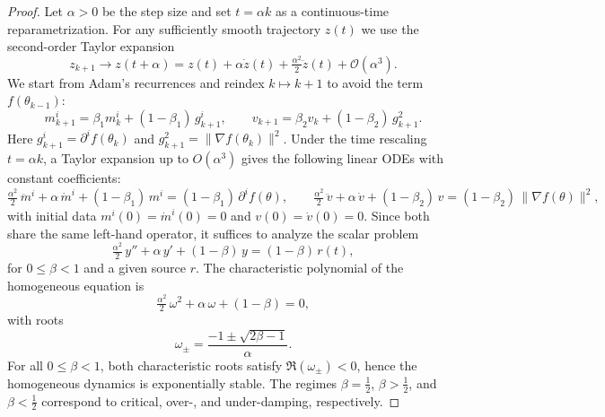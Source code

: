 \documentclass{article} %
\begin{document}
\begin{proof}
Let $\alpha>0$ be the step size and set $t=\alpha k$ as a continuous-time reparametrization. For any sufficiently smooth trajectory $z(t)$ we use the second-order Taylor expansion
\[
z_{k+1} \to z(t+\alpha)=z(t)+\alpha \dot z(t)+\tfrac{\alpha^2}{2}\ddot z(t)+\mathcal{O}(\alpha^3).
\]
We start from Adam’s recurrences and reindex $k\mapsto k+1$ to avoid the term $f(\theta_{k-1})$:
\[
m^i_{k+1}=\beta_1 m^i_k+(1-\beta_1)\,g^i_{k+1},
\qquad
v_{k+1}=\beta_2 v_k+(1-\beta_2)\,g_{k+1}^2.
\]
Here $g^i_{k+1}=\partial^i f(\theta_k)$ and $g_{k+1}^2=\|\nabla f(\theta_k)\|^2$. Under the time rescaling $t=\alpha k$, a Taylor expansion up to $O(\alpha^3)$ gives the following linear ODEs with constant coefficients:
\[
\tfrac{\alpha^2}{2}\,\ddot m^i+\alpha\,\dot m^i+(1-\beta_1)\,m^i=(1-\beta_1)\,\partial^i f(\theta),
\qquad
\tfrac{\alpha^2}{2}\,\ddot v+\alpha\,\dot v+(1-\beta_2)\,v=(1-\beta_2)\,\|\nabla f(\theta)\|^2,
\]
with initial data $m^i(0)=\dot m^i(0)=0$ and $v(0)=\dot v(0)=0$. Since both share the same left-hand operator, it suffices to analyze the scalar problem
\[
\tfrac{\alpha^2}{2}\,y''+\alpha\,y'+(1-\beta)\,y=(1-\beta)\,r(t),
\]
for $0\leq\beta<1$ and a given source $r$. The characteristic polynomial of the homogeneous equation is
\[
\tfrac{\alpha^2}{2}\,\omega^2+\alpha\,\omega+(1-\beta)=0,
\]
with roots
\[
\omega_\pm=\frac{-1\pm\sqrt{2\beta-1}}{\alpha}.
\]
For all $0\le \beta<1$, both characteristic roots satisfy $\Re(\omega_\pm)<0$, hence the homogeneous dynamics is exponentially stable. The regimes $\beta=\tfrac12$, $\beta>\tfrac12$, and $\beta<\tfrac12$ correspond to critical, over-, and under-damping, respectively.


\end{proof}
\end{document}
